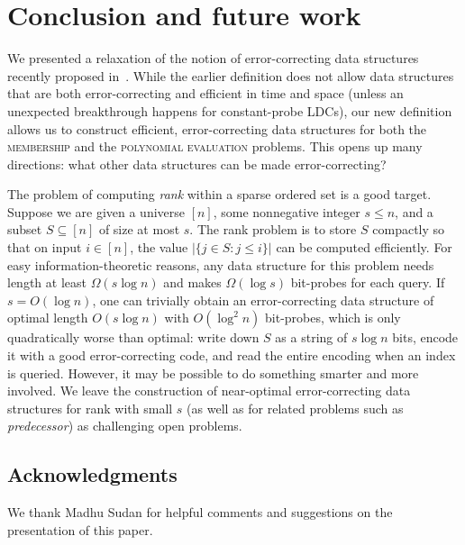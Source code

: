 \documentclass[11pt,english]{article}
\newcommand{\noun}[1]{\textsc{#1}}
\theoremstyle{definition}
\theoremstyle{remark}
\begin{document}
\section{Conclusion and future work\label{sec:Conclusion}}
We presented a relaxation of the notion of error-correcting data structures
recently proposed in~\cite{wolf:ecdata}. While the earlier definition
does not allow data structures that are both error-correcting and
efficient in time and space (unless an unexpected breakthrough happens for
constant-probe LDCs), our new definition allows us to construct
efficient, error-correcting data structures for both the \noun{membership}
and the \noun{polynomial evaluation} problems. This opens up many
directions: what other data structures can be made error-correcting?

The problem of computing \emph{rank} within a sparse ordered set is a good target.
Suppose we are given a universe $[n]$, some nonnegative
integer $s\leq n$, and a subset $S\subseteq[n]$ of size at most
$s$. The rank problem is to store $S$ compactly so that on input
$i\in[n]$, the value $|\{j\in S:j\leq i\}|$ can be computed efficiently.
For easy information-theoretic reasons, any data structure for this problem 
needs length at least $\Omega(s\log n)$ and makes
$\Omega(\log s)$ bit-probes for each query. If $s=O(\log n)$, one
can trivially obtain an error-correcting data structure of optimal length $O(s\log n)$
with $O(\log^{2}n)$ bit-probes, which is only quadratically worse than optimal: 
write down $S$ as a string of $s\log n$ bits, encode it with a good error-correcting code, 
and read the entire encoding when an index is queried.
However, it may be possible to do something smarter and more involved.
We leave the construction of near-optimal error-correcting data structures for rank with small $s$
(as well as for related problems such as \emph{predecessor}) as challenging open problems.

\subsection*{Acknowledgments}
We thank Madhu Sudan for helpful comments and suggestions on the presentation of this paper.




\appendix
\end{document}
